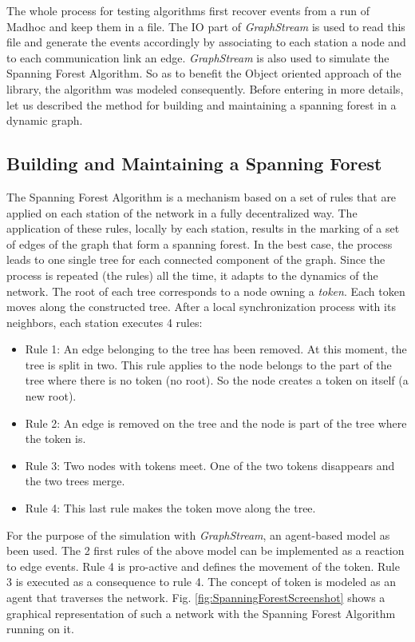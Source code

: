 \documentclass{svmult}
\begin{document}
The whole process for testing algorithms first recover events from a run of 
{\sc Madhoc} and keep them in a file. 
The IO part of \emph{GraphStream} is used to read this file and generate the
events accordingly by associating to each station a node and to each
communication link an edge. 
\emph{GraphStream} is also used to simulate the Spanning Forest
Algorithm. So as to benefit the Object oriented approach of the library, the 
algorithm was modeled consequently. 
Before entering in more details, let us described the method for building and
maintaining a spanning forest in a dynamic graph.

\subsection{Building and Maintaining a Spanning Forest}


The Spanning Forest Algorithm \cite{casteigts_06} is a mechanism based on
a set of rules that are applied on each station of the network in a fully
decentralized way. 
The application of these rules, locally by each station, results in the
marking of a set of edges of the graph that form a spanning forest. 
In the best case, the process leads to one single tree for each connected
component of the graph. 
Since the process is repeated (the rules) all the time, it adapts to the
dynamics of the network. 
The root of each tree corresponds to a node owning a \emph{token}. 
Each token moves along the constructed tree.   
After a local synchronization process with its neighbors, each station
executes 4 rules:    

\begin{itemize}
\item Rule 1: An edge belonging to the tree has been removed. At this moment,
  the tree is split in two. This rule applies to the node belongs to the part
  of the tree where there is no token (no root). So the node creates a token
  on itself (a new root).  
\item Rule 2: An edge is removed on the tree and the node is part of the tree
  where the token is.  
\item Rule 3: Two nodes with tokens meet. One of the two tokens disappears and
  the two trees merge.   
\item Rule 4: This last rule makes the token move along the tree. 
\end{itemize}




For the purpose of the simulation with \emph{GraphStream}, an agent-based
model as been used. The 2 first rules of the above model can be implemented as
a reaction to edge events. 
Rule 4 is pro-active and defines the movement of the token. 
Rule 3 is executed as a consequence to rule 4. 
The concept of token is modeled as an agent that traverses the
network. 
Fig. \ref{fig:SpanningForestScreenshot} shows a graphical representation of
such a network with the Spanning Forest Algorithm running on it.
  
\end{document}
